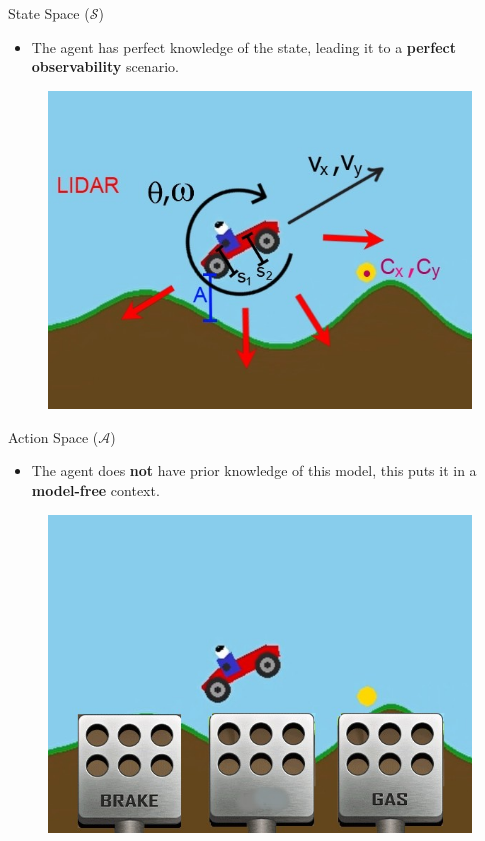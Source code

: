 \documentclass[serif]{beamer}  %
\begin{document}
    \begin{frame}{State Space ($\mathcal{S}$)}
        \begin{itemize}
            \item The agent has perfect knowledge of the state, leading it to a \textbf{perfect observability} scenario.
        \end{itemize}
    
        \begin{figure}
            \centering
            \includegraphics[width=0.8\linewidth]{images/states.jpg}
        \end{figure}
    \end{frame}

    \begin{frame}{Action Space ($\mathcal{A}$)}
        \begin{itemize}
            \item The agent does \textbf{not} have prior knowledge of this model, this puts it in a \textbf{model-free} context.
        \end{itemize}
        \begin{figure}
            \centering
            \includegraphics[width=0.8\linewidth]{images/action_space.jpg}
        \end{figure}
    \end{frame}
\end{document}
